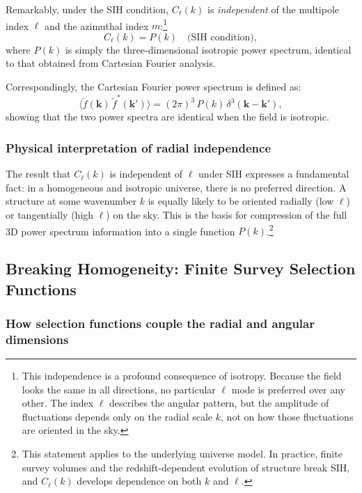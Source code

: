 Remarkably, under the SIH condition, $C_\ell(k)$ is \emph{independent} of the multipole index $\ell$ and
the azimuthal index $m$:\footnote{This independence is a profound consequence of isotropy. Because the field
looks the same in all directions, no particular $\ell$ mode is preferred over any other. The index $\ell$ describes
the angular pattern, but the amplitude of fluctuations depends only on the radial scale $k$, not on how those
fluctuations are oriented in the sky.}
\begin{equation}
C_\ell(k) = P(k) \quad \text{(SIH condition)},
\label{eq:sfb_radial_only}
\end{equation}
where $P(k)$ is simply the three-dimensional isotropic power spectrum, identical to that obtained from Cartesian
Fourier analysis.

Correspondingly, the Cartesian Fourier power spectrum is defined as:
\begin{equation}
\bigl\langle\tilde{f}(\mathbf{k})\,\tilde{f}^*(\mathbf{k}')\bigr\rangle
= (2\pi)^3\,P(k)\,\delta^3(\mathbf{k}-\mathbf{k}'),
\label{eq:cartesian_power_def}
\end{equation}
showing that the two power spectra are identical when the field is isotropic.

\subsubsection{Physical interpretation of radial independence}

The result that $C_\ell(k)$ is independent of $\ell$ under SIH expresses a fundamental fact: in a homogeneous and
isotropic universe, there is no preferred direction. A structure at some wavenumber $k$ is equally likely to be
oriented radially (low $\ell$) or tangentially (high $\ell$) on the sky. This is the basis for compression of the full
3D power spectrum information into a single function $P(k)$.\footnote{This statement applies to the underlying
universe model. In practice, finite survey volumes and the redshift-dependent evolution of structure break SIH,
and $C_\ell(k)$ develops dependence on both $k$ and $\ell$.}

\subsection{Breaking Homogeneity: Finite Survey Selection Functions}

\subsubsection{How selection functions couple the radial and angular dimensions}

